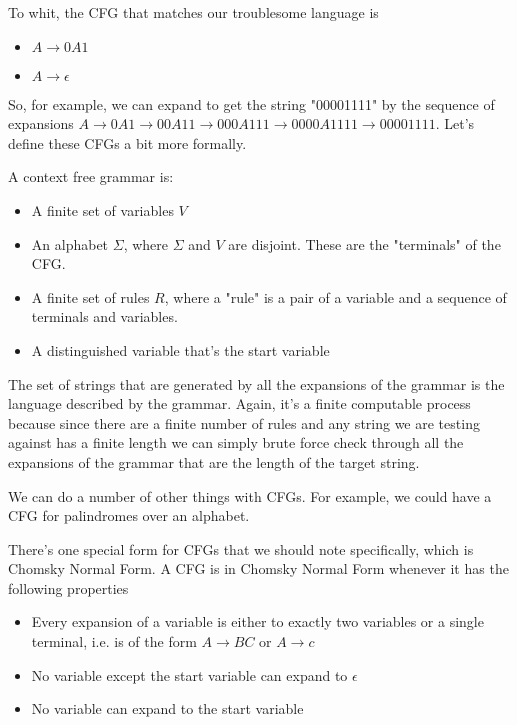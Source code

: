 \documentclass[11pt]{article}
\begin{document}
To whit, the CFG that matches our troublesome language is 

\begin{itemize}
\item $A \to 0A1$
\item $A \to \epsilon$
\end{itemize}

So, for example, we can expand to get the string "00001111" by the sequence of expansions $A \to 0A1 \to 00A11 \to 000A111 \to 0000A1111 \to 00001111$. Let's define these CFGs a bit more formally. 

A context free grammar is:

\begin{itemize}
\item A finite set of variables $V$
\item An alphabet $\Sigma$, where $\Sigma$ and $V$ are disjoint. These are the "terminals" of the CFG.
\item A finite set of rules $R$, where a "rule" is a pair of a variable and a sequence of terminals and variables.
\item A distinguished variable that's the start variable
\end{itemize}

The set of strings that are generated by all the expansions of the grammar is the language described by the grammar. Again, it's a finite computable process because since there are a finite number of rules and any string we are testing against has a finite length we can simply brute force check through all the expansions of the grammar that are the length of the target string.

We can do a number of other things with CFGs. For example, we could have a CFG for palindromes over an alphabet.

There's one special form for CFGs that we should note specifically, which is Chomsky Normal Form. A CFG is in Chomsky Normal Form whenever it has the following properties

\begin{itemize}
\item Every expansion of a variable is either to exactly two variables or a single terminal, i.e. is of the form $A \to BC$ or $A \to c$
\item No variable except the start variable can expand to $\epsilon$
\item No variable can expand to the start variable
\end{itemize}
\end{document}
